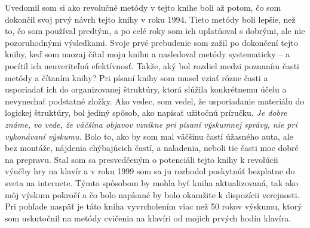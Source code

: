 Uvedomil som si ako revolučné metódy v tejto knihe boli až potom, čo som dokončil svoj prvý návrh tejto knihy v roku 1994. Tieto metódy boli lepšie, než to, čo som používal predtým, a po celé roky som ich uplatňoval s dobrými, ale nie pozoruhodnými výsledkami. Svoje prvé prebudenie som zažil po dokončení tejto knihy, keď som naozaj čítal moju knihu a nasledoval metódy systematicky – a pocítil ich neuveriteľnú efektívnosť. Takže, aký bol rozdiel medzi poznaním časti metódy a čítaním knihy? Pri písaní knihy som musel vziať rôzne časti a usporiadať ich do organizovanej štruktúry, ktorá slúžila konkrétnemu účelu a nevynechať podstatné zložky. Ako vedec, som vedel, že usporiadanie materiálu do logickej štruktúry, bol jediný spôsob, ako napísať užitočnú príručku. \emph{Je dobre známe, vo vede, že väčšina objavov vznikne pri písaní výskumnej správy, nie pri vykonávaní výskumu.} Bolo to, ako by som mal väčšinu častí úžasného auta, ale bez montáže, nájdenia chýbajúcich častí, a naladenia, neboli tie časti moc dobré na prepravu. Stal som sa presvedčeným o potenciáli tejto knihy k revolúcii výučby hry na klavír a v roku 1999 som sa ju rozhodol poskytnúť bezplatne do sveta na internete. Týmto spôsobom by mohla byť kniha aktualizovaná, tak ako môj výskum pokročí a čo bolo napísané by bolo okamžite k dispozícii verejnosti. Pri pohľade naspäť je táto kniha vyvrcholením viac než 50 rokov výskumu, ktorý som uskutočnil na metódy cvičenia na klavíri od mojich prvých hodín klavíra.

